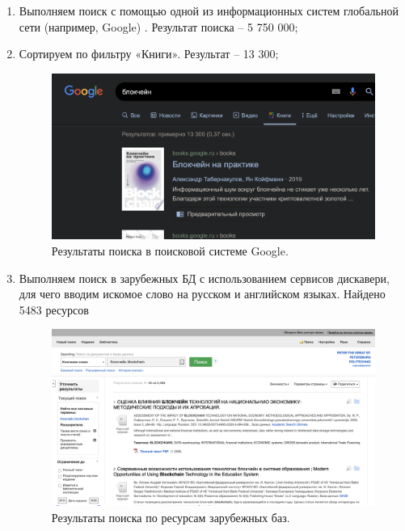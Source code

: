 \documentclass[14pt,a4paper,report]{report}
\begin{document}
\begin{enumerate}
	
	\item Выполняем поиск с помощью одной из информационных систем глобальной сети (например, Google) . Результат поиска – 5 750 000;
	
	\item Сортируем по фильтру «Книги». Результат – 13 300;
	\begin{figure}[h!]
    \centering
    \includegraphics[scale = 0.33]{1.png}
    \caption{Результаты поиска в поисковой системе Google.}
    \label{image:1}
    \end{figure}
    
    \item Выполняем поиск в зарубежных БД с использованием сервисов дискавери, для чего вводим искомое слово на русском и английском языках. Найдено 5483 ресурсов
	\begin{figure}[h!]
    \centering
    \includegraphics[scale = 0.33]{2.png}
    \caption{Результаты поиска по ресурсам зарубежных баз.}
    \label{image:1}
    \end{figure}
    
    \clearpage
    

\end{enumerate}
\end{document}
